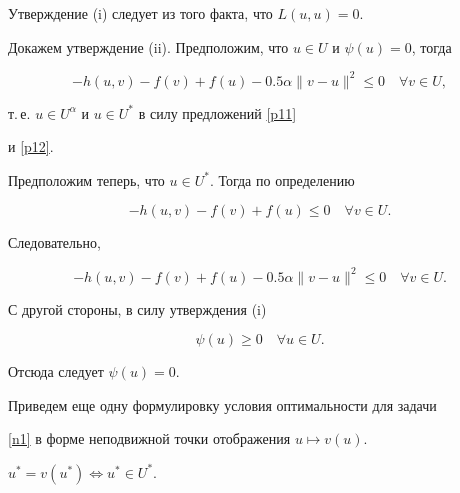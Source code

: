 \begin{pf}


Утверждение (i) следует из того факта, что $L(u,u)=0$.


Докажем утверждение (ii). Предположим, что $u \in U$ и $\psi(u) = 0$, тогда 


$$


-h(u,v) - f(v) + f(u) - 0.5 \alpha \|v-u\|^2 \le 0 \quad 


\forall v \in U,


$$


т.\,е. $u \in U^\alpha$ и $u \in U^*$ в силу предложений \ref{p11} 


и \ref{p12}.





Предположим теперь, что $u \in U^*$. Тогда по определению


$$


-h(u,v) - f(v) + f(u) \le 0 \quad \forall v \in U.


$$


Следовательно, 


$$


-h(u,v) - f(v) + f(u) - 0.5 \alpha \|v-u\|^2 \le 0 


\quad \forall v \in U.


$$


С другой стороны, в силу утверждения (i) 


$$


\psi(u) \ge 0 \quad \forall u \in U.


$$


Отсюда следует $\psi(u) = 0$.


\end{pf}





Приведем еще одну формулировку условия оптимальности для задачи 


\ref{n1} в форме неподвижной точки отображения $u \mapsto v(u)$.





\begin{props}\label{p15}


$u^* =v(u^*) \Longleftrightarrow u^* \in U^* $.


\end{props}





